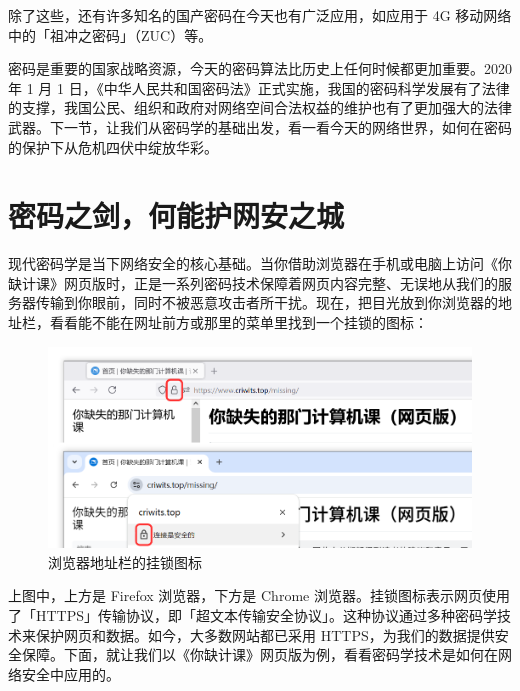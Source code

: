 除了这些，还有许多知名的国产密码在今天也有广泛应用，如应用于 4G 移动网络中的「祖冲之密码」（ZUC）等。

密码是重要的国家战略资源，今天的密码算法比历史上任何时候都更加重要。2020 年 1 月 1 日，《中华人民共和国密码法》正式实施，我国的密码科学发展有了法律的支撑，我国公民、组织和政府对网络空间合法权益的维护也有了更加强大的法律武器。下一节，让我们从密码学的基础出发，看一看今天的网络世界，如何在密码的保护下从危机四伏中绽放华彩。

\section{密码之剑，何能护网安之城}

现代密码学是当下网络安全的核心基础。当你借助浏览器在手机或电脑上访问《你缺计课》网页版时，正是一系列密码技术保障着网页内容完整、无误地从我们的服务器传输到你眼前，同时不被恶意攻击者所干扰。现在，把目光放到你浏览器的地址栏，看看能不能在网址前方或那里的菜单里找到一个挂锁的图标：

\begin{figure}[htb!]
  \centering
  \includegraphics[width=.75\textwidth]{assets/surpass/Lock_signs_in_browsers.png}
  \caption{浏览器地址栏的挂锁图标}
  \label{fig:Lock_signs_in_browsers}
\end{figure}

上图中，上方是 Firefox 浏览器，下方是 Chrome 浏览器。挂锁图标表示网页使用了「HTTPS」传输协议，即「超文本传输安全协议」。这种协议通过多种密码学技术来保护网页和数据。如今，大多数网站都已采用 HTTPS，为我们的数据提供安全保障。下面，就让我们以《你缺计课》网页版为例，看看密码学技术是如何在网络安全中应用的。


